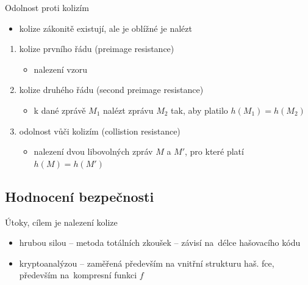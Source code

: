 Odolnost proti kolizím
\begin{itemize}
    \item kolize zákonitě existují, ale je oblížné je nalézt
\end{itemize}
\begin{enumerate}
    \item kolize prvního řádu (preimage resistance)
    \begin{itemize}
        \item nalezení vzoru
    \end{itemize}
    \item kolize druhého řádu (second preimage resistance)
    \begin{itemize}
        \item k dané zprávě $M_{1}$ nalézt zprávu $M_{2}$ tak, aby platilo $h(M_{1}) = h(M_{2})$
    \end{itemize}
    \item odolnost vůči kolizím (collistion resistance)
    \begin{itemize}
        \item nalezení dvou libovolných zpráv $M$ a $M'$, pro které platí $h(M) = h(M')$
    \end{itemize}
\end{enumerate}

\subsection{Hodnocení bezpečnosti}
Útoky, cílem je nalezení kolize
\begin{itemize}
    \item hrubou silou -- metoda totálních zkoušek -- závisí na~délce hašovacího kódu
    \item kryptoanalýzou -- zaměřená především na vnitřní strukturu haš. fce, především na~kompresní funkci $f$
\end{itemize}

